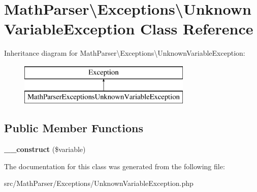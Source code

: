 \hypertarget{classMathParser_1_1Exceptions_1_1UnknownVariableException}{\section{Math\-Parser\textbackslash{}Exceptions\textbackslash{}Unknown\-Variable\-Exception Class Reference}
\label{classMathParser_1_1Exceptions_1_1UnknownVariableException}
}
Inheritance diagram for Math\-Parser\textbackslash{}Exceptions\textbackslash{}Unknown\-Variable\-Exception\-:\begin{figure}[H]
\begin{center}
\leavevmode
\includegraphics[height=2.000000cm]{classMathParser_1_1Exceptions_1_1UnknownVariableException}
\end{center}
\end{figure}
\subsection*{Public Member Functions}
\begin{DoxyCompactItemize}
\item 
\hypertarget{classMathParser_1_1Exceptions_1_1UnknownVariableException_a040bbcb3b93af9e5a62c4af98b5bc8dd}{{\bfseries \-\_\-\-\_\-construct} (\$variable)}\label{classMathParser_1_1Exceptions_1_1UnknownVariableException_a040bbcb3b93af9e5a62c4af98b5bc8dd}

\end{DoxyCompactItemize}


The documentation for this class was generated from the following file\-:\begin{DoxyCompactItemize}
\item 
src/\-Math\-Parser/\-Exceptions/Unknown\-Variable\-Exception.\-php\end{DoxyCompactItemize}
